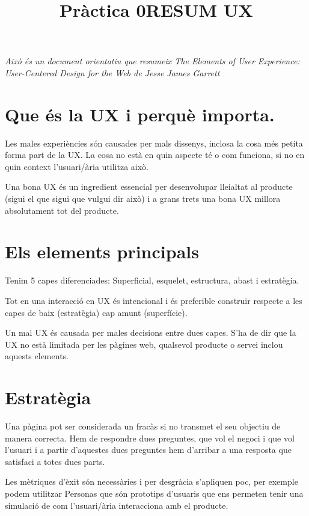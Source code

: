 \documentclass{article}
\title{Pràctica 0}
\begin{document}
\title{RESUM UX}

\hfill
\textit{Això és un document orientatiu que resumeix The Elements of User Experience: User-Centered Design for the Web de Jesse James Garrett}
\hfill 

\section{Que és la UX i perquè importa.}
\hfill

Les males experiències són causades per mals dissenys, inclosa la cosa més petita forma part de la UX. La cosa no està en quin aspecte té o com funciona, si no en quin context l’usuari/ària utilitza això. 

Una bona UX és un ingredient essencial per desenvolupar lleialtat al producte (sigui el que sigui que vulgui dir això) i a grans trets una bona UX millora absolutament tot del producte.

\section{Els elements principals}
\hfill

Tenim 5 capes diferenciades: Superficial, esquelet, estructura, abast i estratègia.

Tot en una interacció en UX és intencional i és preferible construir respecte a les capes de baix (estratègia) cap amunt (superfície).

Un mal UX és causada per males decisions entre dues capes. S’ha de dir que la UX no està limitada per les pàgines web, qualsevol producte o servei inclou aquests elements.


\section{Estratègia}
\hfill

Una pàgina pot ser considerada un fracàs si no transmet el seu objectiu de manera correcta. Hem de respondre dues preguntes, que vol el negoci i que vol l’usuari i a partir d’aquestes dues preguntes hem d'arribar a una resposta que satisfaci a totes dues parts.

Les mètriques d’èxit són necessàries i per desgràcia s’apliquen poc, per exemple podem utilitzar Personas que són prototips d’usuaris que ens permeten tenir una simulació de com l’usuari/ària interacciona amb el producte.
\end{document}
